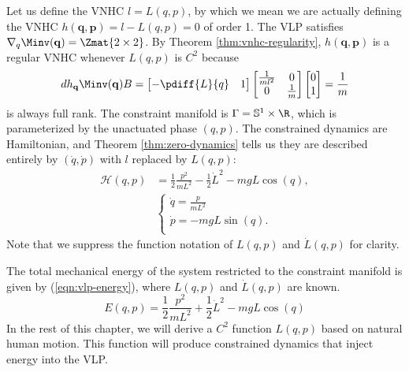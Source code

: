Let us define the VNHC \(l = L(q,p)\), by which we mean we are
actually defining the VNHC \(h(\mathbf{q},\mathbf{p}) = l - L(q,p) = 0\) of
order 1.
The VLP satisfies
\(\nabla_q \Minv(\mathbf{q}) = \Zmat{2 \times 2}\).
By Theorem \ref{thm:vnhc-regularity},
\(h(\mathbf{q},\mathbf{p})\) is a regular VNHC whenever 
\(L(q,p)\) is \(C^2\) because
\[
   dh_{\mathbf{q}} \Minv(\mathbf{q})B = 
   \begin{bmatrix}
      -\pdiff{L}{q} & 1
   \end{bmatrix}
   \begin{bmatrix}
      \frac{1}{ml^2}  & 0 \\
      0 & \frac{1}{m}
   \end{bmatrix} 
   \begin{bmatrix}
      0 \\ 
      1
   \end{bmatrix}
   = \frac{1}{m}
\]
is always full rank.
The constraint manifold is
\(\Gamma = \mathbb{S}^1 \times \R\), which is parameterized by the unactuated
phase \((q,p)\).
The constrained dynamics are Hamiltonian, and Theorem \ref{thm:zero-dynamics}
tells us they are described entirely by \((\dot{q},\dot{p})\) with \(l\)
replaced by \(L(q,p)\):
\begin{align}\label{eqn:vlp-hamiltonian}
   \mathcal{H}(q,p) &= \frac{1}{2} \frac{p^2}{mL^2} - \frac{1}{2}\dot{L}^2 -
      mgL\cos(q)
   , \\
  &\begin{cases}
      \dot{q} = \frac{p}{m L^2} \\
      \dot{p} = -mgL\sin(q)
      . \\ 
   \end{cases} \nonumber
\end{align}
Note that we suppress the function notation of \(L(q,p)\) and
\(\dot{L}(q,p)\) for clarity.

The total mechanical energy of the system restricted to the constraint manifold
is given by (\ref{eqn:vlp-energy}), where \(L(q,p)\) and \(\dot{L}(q,p)\) are
known.
\begin{equation}\label{eqn:vlp-energy}
   E(q,p) = \frac{1}{2} \frac{p^2}{mL^2} + \frac{1}{2}\dot{L}^2 - mgL\cos(q)
\end{equation}
In the rest of this chapter, we will derive a \(C^2\) function \(L(q,p)\) based
on natural human motion.
This function will produce constrained dynamics that inject energy into the VLP.


